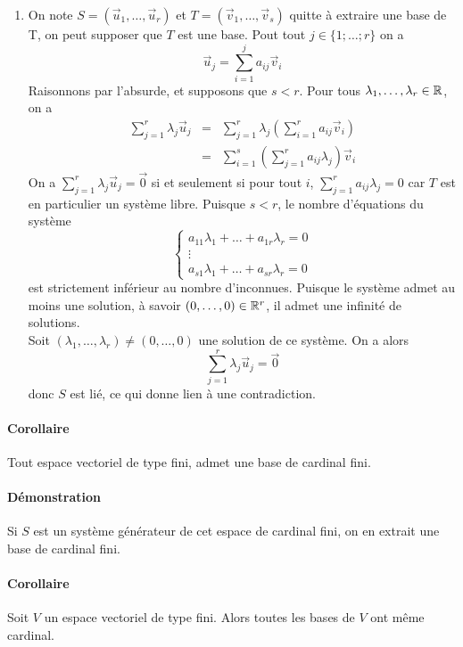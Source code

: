 \begin{enumerate}
  \item On note $S = (\vec{u}_1, \ldots, \vec{u}_r)$ et $T = (\vec{v}_1, \ldots, \vec{v}_s)$ quitte à extraire une base de T, on peut supposer que $T$ est une base. Pout tout $j \in \{1; \ldots ; r\}$ on a
    $$\vec{u}_j = \sum_{i=1}^{j} {a_{ij} \vec{v}_i}$$
    Raisonnons par l'absurde, et supposons que $s < r$. Pour tous $\lambda_1, \ldots, \lambda_r \in \mathbb{R}$, on a
    \begin{eqnarray*}
      \sum_{j=1}^r { \lambda_j \vec{u}_j} &=& \sum_{j=1}^r {\lambda_j \left( \sum_{i=1}^r {a_{ij}\vec{v}_i} \right)} \\
        &=& \sum_{i=1}^s {\left( \sum_{j=1}^r {a_{ij}\lambda_j} \right) \vec{v}_i }
    \end{eqnarray*}
    On a $\sum_{j=1}^r {\lambda_j \vec{u}_j } = \vec{0}$ si et seulement si pour tout $i$, $\sum_{j=1}^r {a_{ij} \lambda_j } = 0$ car $T$ est en particulier un système libre. Puisque $s < r$, le nombre d'équations du système
    $$ \left\{ \begin{matrix}
      a_{11} \lambda_1 + \ldots + a_{1r} \lambda_r = 0 \\
      \vdots \\
      a_{s1} \lambda_1 + \ldots + a_{sr} \lambda_r = 0
    \end{matrix} \right. $$
    est strictement inférieur au nombre d'inconnues. Puisque le système admet au moins une solution, à savoir $(0, \ldots, 0) \in \mathbb{R}^r$, il admet une infinité de solutions. \\
    Soit $(\lambda_1, \ldots, \lambda_r) \neq (0, \ldots, 0)$ une solution de ce système. On a alors
    $$\sum_{j=1}^r {\lambda_j \vec{u}_j } = \vec{0}$$
    donc $S$ est lié, ce qui donne lien à une contradiction.
\end{enumerate}

\paragraph{Corollaire} Tout espace vectoriel de type fini, admet une base de cardinal fini.
\paragraph{Démonstration} Si $S$ est un système générateur de cet espace de cardinal fini, on en extrait une base de cardinal fini.

\paragraph{Corollaire} Soit $V$ un espace vectoriel de type fini. Alors toutes les bases de $V$ ont même cardinal.

